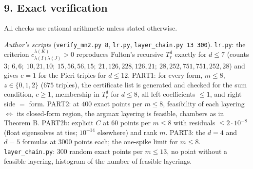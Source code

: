 \documentclass[
  11pt,
  a4paper,
]{article}
\begin{document}
\subsection{9. Exact verification}\label{exact-verification}

All checks use rational arithmetic unless stated otherwise.

\emph{Author's scripts} ({\small\texttt{verify\_\allowbreak{}mn2.\allowbreak{}py\ 8}}, {\small\texttt{lr.\allowbreak{}py}},
{\small\texttt{layer\_\allowbreak{}chain.\allowbreak{}py\ 13\ 300}}). {\small\texttt{lr.\allowbreak{}py}}: the criterion
\(c^{\lambda(K)}_{\lambda(I)\lambda(J)}>0\) reproduces Fulton's
recursive \(T^d_r\) exactly for \(d\le7\) (counts
\(3;\allowbreak{}\ 6,\allowbreak{}6;\allowbreak{}\ 10,\allowbreak{}21,\allowbreak{}10;\allowbreak{}\ 15,\allowbreak{}56,\allowbreak{}56,\allowbreak{}15;\allowbreak{}\ 21,\allowbreak{}126,\allowbreak{}228,\allowbreak{}126,\allowbreak{}21;\allowbreak{}\ 28,\allowbreak{}252,\allowbreak{}751,\allowbreak{}751,\allowbreak{}252,\allowbreak{}28\))
and gives \(c=1\) for the Pieri triples for \(d\le12\). PART1: for every
form, \(m\le8\), \(z\in\{0,\allowbreak{}1,\allowbreak{}2\}\) (\(675\) triples), the certificate
list is generated and checked for the sum condition, \(c\ge1\),
membership in \(T^d_r\) for \(d\le8\), all left coefficients \(\le1\),
and right side \(=\) form. PART2: at \(400\) exact points per \(m\le8\),
feasibility of each layering \(\iff\) its closed-form region, the argmax
layering is feasible, chambers as in Theorem B. PART2b: explicit \(C\)
at \(60\) points per \(m\le8\) with residuals \(\le2\cdot10^{-8}\)
(float eigensolves at ties; \(10^{-14}\) elsewhere) and rank \(m\).
PART3: the \(d=4\) and \(d=5\) formulas at \(3000\) points each; the
one-spike limit for \(m\le8\). {\small\texttt{layer\_\allowbreak{}chain.\allowbreak{}py}}: \(300\) random
exact points per \(m\le13\), no point without a feasible layering,
histogram of the number of feasible layerings.
\end{document}
